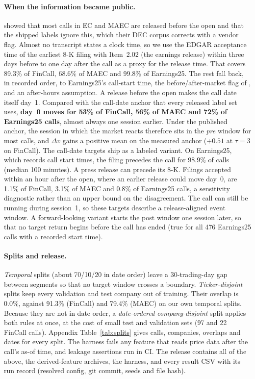 \paragraph{When the information became public.}
\label{sec:timing}
\citet{scss2024} showed that most calls in EC and MAEC are released before the
open and that the shipped labels ignore this, which their DEC corpus corrects
with a vendor flag. Almost no transcript states a clock time, so we use the
EDGAR acceptance time of the earliest 8-K filing with Item~2.02 (the earnings
release) within three days before to one day after the call as a proxy for the
release time. That covers 89.3\% of FinCall, 68.6\% of MAEC and 99.8\% of Earnings25. The
rest fall back, in recorded order, to Earnings25's call-start time, the
before/after-market flag of \citet{scss2024}, and an after-hours assumption. A
release before the open makes the call date itself day~1. Compared with the
call-date anchor that every released label set uses, \textbf{day~0 moves for 53\%
of FinCall, 56\% of MAEC and 72\% of Earnings25 calls}, almost always one session
earlier. Under the published anchor, the session in which the market reacts
therefore sits in the \emph{pre} window for most calls, and $\Delta v$ gains a
positive mean on the measured anchor ($+0.51$ at $\tau{=}3$ on FinCall). The
call-date targets ship as a labeled variant. On
Earnings25, which records call start times, the filing precedes the call for
98.9\% of calls (median 100 minutes). A press release can precede its 8-K.
Filings accepted within an hour after the open, where an earlier release could
move day~0, are 1.1\% of FinCall, 3.1\% of MAEC and 0.8\% of Earnings25 calls,
a sensitivity diagnostic rather than an upper bound on the disagreement. The
call can still be running during session~1, so these targets describe a release-aligned event window. A
forward-looking variant starts the post window one session later, so that no
target return begins before the call has ended (true for all 476 Earnings25
calls with a recorded start time).

\paragraph{Splits and release.}
\emph{Temporal} splits (about 70/10/20 in date order) leave a 30-trading-day gap
between segments so that no target window crosses a boundary.
\emph{Ticker-disjoint} splits keep every validation and test company out of
training. Their overlap is 0.0\%, against 91.3\% (FinCall) and 79.4\% (MAEC) on
our own temporal splits. Because they are not in date order, a
\emph{date-ordered company-disjoint} split applies both rules at once, at the
cost of small test and validation sets (97 and 22 FinCall calls). Appendix Table~\ref{tab:splits} gives calls,
companies, overlaps and dates for every split. The harness fails any feature that reads price data after
the call's as-of time, and leakage assertions run in CI. The release contains all
of the above, the derived-feature archives, the harness, and every result CSV with
its run record (resolved config, git commit, seeds and file hash).
